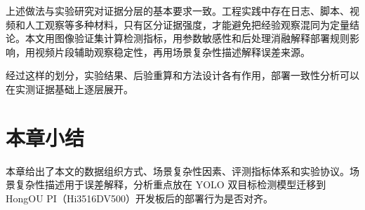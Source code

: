 上述做法与实验研究对证据分层的基本要求一致。工程实践中存在日志、脚本、视频和人工观察等多种材料，只有区分证据强度，才能避免把经验观察混同为定量结论。本文用图像验证集计算检测指标，用参数敏感性和后处理消融解释部署规则影响，用视频片段辅助观察稳定性，再用场景复杂性描述解释误差来源。

经过这样的划分，实验结果、后验重算和方法设计各有作用，部署一致性分析可以在实测证据基础上逐层展开。

\section{本章小结}

本章给出了本文的数据组织方式、场景复杂性因素、评测指标体系和实验协议。场景复杂性描述用于误差解释，分析重点放在 YOLO 双目标检测模型迁移到 HongOU PI（Hi3516DV500）开发板后的部署行为是否对齐。
